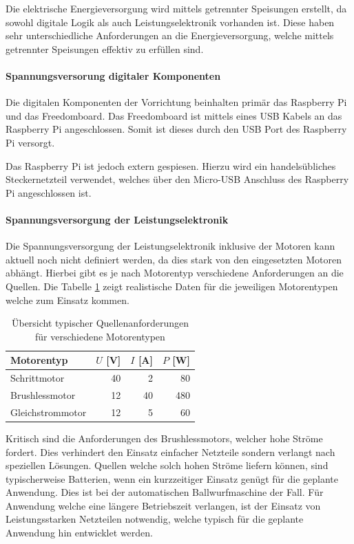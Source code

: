 
Die elektrische Energieversorgung wird mittels getrennter Speisungen erstellt,
da sowohl digitale Logik als auch Leistungselektronik vorhanden ist. Diese
haben sehr unterschiedliche Anforderungen an die Energieversorgung, welche
mittels getrennter Speisungen effektiv zu erfüllen sind.

\paragraph{Spannungsversorung digitaler Komponenten}
Die digitalen Komponenten der Vorrichtung beinhalten primär das
Raspberry Pi und das Freedomboard. Das Freedomboard ist mittels eines USB
Kabels an das Raspberry Pi angeschlossen. Somit ist dieses durch den
USB Port des Raspberry Pi versorgt.

Das Raspberry Pi ist jedoch extern gespiesen. Hierzu wird ein
handelsübliches Steckernetzteil verwendet, welches über den Micro-USB
Anschluss des Raspberry Pi angeschlossen ist.

\paragraph{Spannungsversorgung der Leistungselektronik}
Die Spannungsversorgung der Leistungselektronik inklusive
der Motoren kann aktuell noch nicht definiert werden, da dies stark von den
eingesetzten Motoren abhängt. Hierbei gibt es je nach Motorentyp verschiedene
Anforderungen an die Quellen. Die Tabelle \ref{tab:power-requirement} zeigt
realistische Daten für die jeweiligen Motorentypen welche zum Einsatz kommen.

\begin{table}[h!]
	\centering
	\begin{tabular}{l r r r}
		Motorentyp
			& $U$ [V]
			& $I$ [A] 
			& $P$ [W] \\
		\hline
		Schrittmotor
			& 40
			& 2 
			& 80 \\
		Brushlessmotor
			& 12
			& 40
			& 480 \\
		Gleichstrommotor
			& 12
			& 5
			& 60 \\
	\end{tabular}
	\caption{Übersicht typischer Quellenanforderungen für verschiedene
		Motorentypen}
	\label{tab:power-requirement}
\end{table}

Kritisch sind die Anforderungen des Brushlessmotors, welcher hohe Ströme
fordert. Dies verhindert den Einsatz einfacher Netzteile sondern verlangt
nach speziellen Lösungen. Quellen welche solch hohen Ströme liefern können,
sind typischerweise Batterien, wenn ein kurzzeitiger Einsatz genügt für die
geplante Anwendung. Dies ist bei der automatischen Ballwurfmaschine der
Fall. Für Anwendung welche eine längere Betriebszeit verlangen, ist der
Einsatz von Leistungsstarken Netzteilen notwendig, welche typisch für die
geplante Anwendung hin entwicklet werden.

